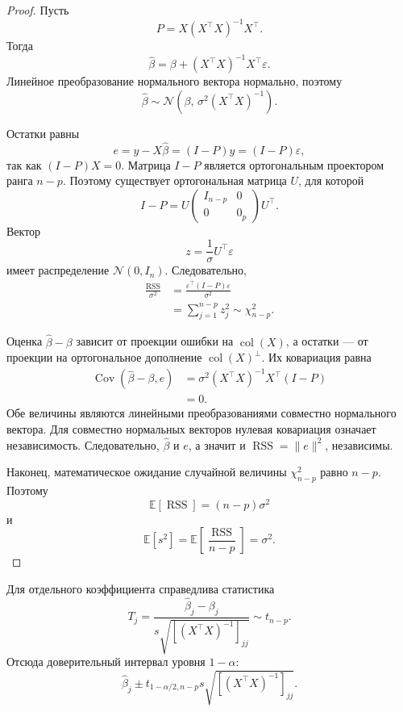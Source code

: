 \documentclass[12pt,a4paper]{article}
\theoremstyle{definition}
\theoremstyle{remark}
\newcommand{\E}{\mathbb{E}}
\newcommand{\Cov}{\operatorname{Cov}}
\newcommand{\col}{\operatorname{col}}
\begin{document}
\begin{proof}
Пусть
\[
    P=X(X^\top X)^{-1}X^\top.
\]
Тогда
\[
    \widehat\beta
    =
    \beta+
    (X^\top X)^{-1}X^\top\varepsilon.
\]
Линейное преобразование нормального вектора нормально, поэтому
\[
    \widehat\beta
    \sim
    \mathcal{N}
    \left(
        \beta,\,
        \sigma^2(X^\top X)^{-1}
    \right).
\]

Остатки равны
\[
    e=y-X\widehat\beta
    =
    (I-P)y
    =
    (I-P)\varepsilon,
\]
так как $(I-P)X=0$. Матрица $I-P$ является ортогональным проектором
ранга $n-p$. Поэтому существует ортогональная матрица $U$, для которой
\[
    I-P
    =
    U
    \begin{pmatrix}
        I_{n-p}&0\\
        0&0_p
    \end{pmatrix}
    U^\top.
\]
Вектор
\[
    z=\frac{1}{\sigma}U^\top\varepsilon
\]
имеет распределение $\mathcal{N}(0,I_n)$. Следовательно,
\[
\begin{split}
    \frac{\operatorname{RSS}}{\sigma^2}
    &=
    \frac{\varepsilon^\top(I-P)\varepsilon}{\sigma^2}\\
    &=
    \sum_{j=1}^{n-p}z_j^2
    \sim
    \chi^2_{n-p}.
\end{split}
\]

Оценка $\widehat\beta-\beta$ зависит от проекции ошибки на
$\col(X)$, а остатки --- от проекции на ортогональное дополнение
$\col(X)^\perp$. Их ковариация равна
\[
\begin{split}
    \Cov(\widehat\beta-\beta,e)
    &=
    \sigma^2
    (X^\top X)^{-1}X^\top(I-P)\\
    &=0.
\end{split}
\]
Обе величины являются линейными преобразованиями совместно нормального
вектора. Для совместно нормальных векторов нулевая ковариация означает
независимость. Следовательно, $\widehat\beta$ и $e$, а значит и
$\operatorname{RSS}=\|e\|^2$, независимы.

Наконец, математическое ожидание случайной величины
$\chi^2_{n-p}$ равно $n-p$. Поэтому
\[
    \E[\operatorname{RSS}]
    =
    (n-p)\sigma^2
\]
и
\[
    \E[s^2]
    =
    \E
    \left[
        \frac{\operatorname{RSS}}{n-p}
    \right]
    =
    \sigma^2.
\]
\end{proof}

Для отдельного коэффициента справедлива статистика
\[
    T_j
    =
    \frac{
        \widehat\beta_j-\beta_j
    }{
        s\sqrt{[(X^\top X)^{-1}]_{jj}}
    }
    \sim
    t_{n-p}.
\]
Отсюда доверительный интервал уровня $1-\alpha$:
\[
    \widehat\beta_j
    \pm
    t_{1-\alpha/2,n-p}
    s\sqrt{[(X^\top X)^{-1}]_{jj}}.
\]
\end{document}
